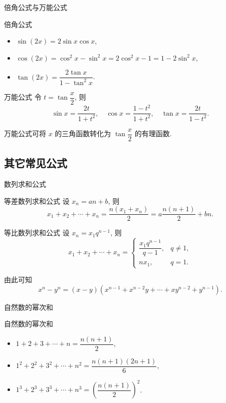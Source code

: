 \begin{frame}{倍角公式与万能公式}
	\onslide<+->
	\begin{block}{倍角公式}
		\begin{itemize}
			\item $\sin(2x)=2\sin x\cos x$,
			\item $\cos(2x)=\cos^2x-\sin^2x=2\cos^2x-1=1-2\sin^2x$,
			\item $\tan(2x)=\dfrac{2\tan x}{1-\tan^2x}$.
		\end{itemize}
	\end{block}
	\onslide<+->
	\begin{block}{万能公式}
		令 $t=\tan\dfrac x2$, 则
		\[\sin x=\frac{2t}{1+t^2},\quad
			\cos x=\frac{1-t^2}{1+t^2},\quad
			\tan x=\frac{2t}{1-t^2}.\]
	\end{block}
	\onslide<+->
	万能公式可将 $x$ 的三角函数转化为 $\tan \dfrac x2$ 的有理函数.
\end{frame}

\subsection{其它常见公式}

\begin{frame}{数列求和公式}
	\onslide<+->
	\begin{block}{等差数列求和公式}
		设 $x_n=an+b$, 则
		\[x_1+x_2+\cdots+x_n=\frac{n(x_1+x_n)}2=a\frac{n(n+1)}2+bn.\]
	\end{block}
	\onslide<+->
	\begin{block}{等比数列求和公式}
		设 $x_n=x_1 q^{n-1}$, 则
		\[x_1+x_2+\cdots+x_n=\begin{cases}
			\dfrac{x_1 q^{n-1}}{q-1},& q\neq 1,\\
			nx_1, & q=1.
		\end{cases}\]
	\end{block}
	\onslide<+->
	由此可知
	\[x^n-y^n=(x-y)(x^{n-1}+x^{n-2}y+\cdots+xy^{n-2}+y^{n-1}).\]
\end{frame}


\begin{frame}{自然数的幂次和}
	\onslide<+->
	\begin{block}{自然数的幂次和}
		\begin{itemize}
			\item $1+2+3+\cdots+n=\dfrac{n(n+1)}2$,
			\item $1^2+2^2+3^2+\cdots+n^2=\dfrac{n(n+1)(2n+1)}6$,
			\item $1^3+2^3+3^3+\cdots+n^3=\left(\dfrac{n(n+1)}2\right)^2$.
		\end{itemize}
	\end{block}
\end{frame}


